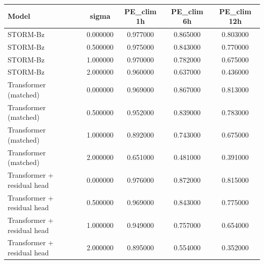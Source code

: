 \begin{tabular}{lcccc}
\toprule
Model & sigma & PE\_clim 1h & PE\_clim 6h & PE\_clim 12h \\
\midrule
STORM-Bz & 0.000000 & 0.977000 & 0.865000 & 0.803000 \\
STORM-Bz & 0.500000 & 0.975000 & 0.843000 & 0.770000 \\
STORM-Bz & 1.000000 & 0.970000 & 0.782000 & 0.675000 \\
STORM-Bz & 2.000000 & 0.960000 & 0.637000 & 0.436000 \\
Transformer (matched) & 0.000000 & 0.969000 & 0.867000 & 0.813000 \\
Transformer (matched) & 0.500000 & 0.952000 & 0.839000 & 0.783000 \\
Transformer (matched) & 1.000000 & 0.892000 & 0.743000 & 0.675000 \\
Transformer (matched) & 2.000000 & 0.651000 & 0.481000 & 0.391000 \\
Transformer + residual head & 0.000000 & 0.976000 & 0.872000 & 0.815000 \\
Transformer + residual head & 0.500000 & 0.969000 & 0.843000 & 0.775000 \\
Transformer + residual head & 1.000000 & 0.949000 & 0.757000 & 0.654000 \\
Transformer + residual head & 2.000000 & 0.895000 & 0.554000 & 0.352000 \\
\bottomrule
\end{tabular}
